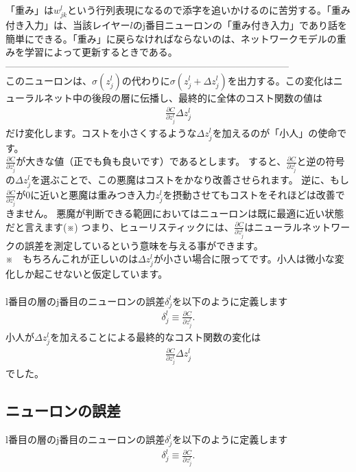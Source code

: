 \documentclass[11pt,a4paper,fleqn]{jsarticle}
\begin{document}
「重み」は$w^l_{jk}$という行列表現になるので添字を追いかけるのに苦労する。「重み付き入力」は、当該レイヤー$l$のj番目ニューロンの「重み付き入力」であり話を簡単にできる。「重み」に戻らなければならないのは、ネットワークモデルの重みを学習によって更新するときである。\\
-----------------------------------------------------------------------------------------\\
このニューロンは、$\sigma {(z^l_j)}$の代わりに$\sigma {(z^l_j + \Delta z^l_j)}$を出力する。この変化はニューラルネット中の後段の層に伝播し、最終的に全体のコスト関数の値は\\
\begin{eqnarray}
 \frac{\partial C}{\partial z^l_j}\Delta z^l_j \nonumber
\end{eqnarray}
だけ変化します。コストを小さくするような$\Delta z^l_j$を加えるのが「小人」の使命です。\\
 $\frac{\partial C}{\partial z^l_j}$が大きな値（正でも負も良いです）であるとします。 すると、$\frac{\partial C}{\partial z^l_j}$と逆の符号の$\Delta z^l_j$を選ぶことで、この悪魔はコストをかなり改善させられます。 逆に、もし$\frac{\partial C}{\partial z^l_j}$が0に近いと悪魔は重みつき入力$z^l_j$を摂動させてもコストをそれほどは改善できません。 悪魔が判断できる範囲においてはニューロンは既に最適に近い状態だと言えます(※)  つまり、ヒューリスティックには、$\frac{\partial C}{\partial z^l_j}$はニューラルネットワークの誤差を測定しているという意味を与える事ができます。\\
 ※　もちろんこれが正しいのは$\Delta z^l_j$が小さい場合に限ってです。小人は微小な変化しか起こせないと仮定しています。\\
 \\
 l番目の層のj番目のニューロンの誤差$\delta ^l_j$を以下のように定義します
\begin{eqnarray}
  \delta^l_j \equiv \frac{\partial C}{\partial z^l_j}. \nonumber
\end{eqnarray}
小人が$\Delta z^l_j$を加えることによる最終的なコスト関数の変化は
\begin{eqnarray}
 \frac{\partial C}{\partial z^l_j}\Delta z^l_j \nonumber
\end{eqnarray}
でした。
\subsection{ニューロンの誤差}
l番目の層のj番目のニューロンの誤差$\delta^l_j$を以下のように定義します
\begin{eqnarray}
  \delta^l_j \equiv \frac{\partial C}{\partial z^l_j}.
\end{eqnarray}
\end{document}
